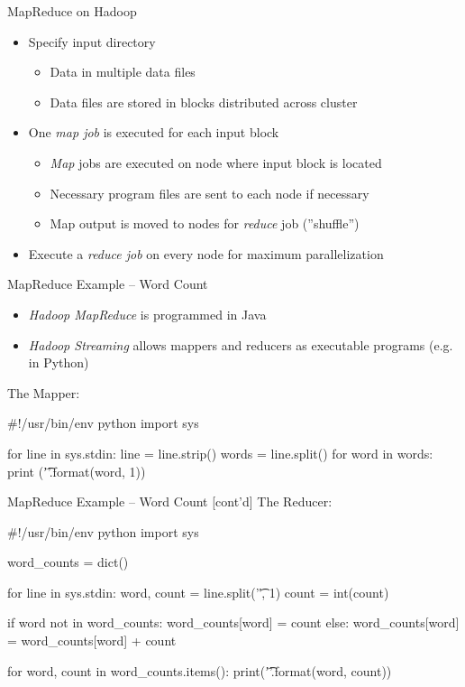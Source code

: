 \documentclass[ignorenonframetext,xcolor=x11names]{beamer}
\begin{document}
\begin{frame}{MapReduce on Hadoop}
\begin{itemize}
   \item Specify input directory
   \begin{itemize}
       \item Data in multiple data files
       \item Data files are stored in blocks distributed across cluster
   \end{itemize}
   \item One \emph{map job} is executed for each input block
   \begin{itemize}
       \item \emph{Map} jobs are executed on node where input block is located
       \item Necessary program files are sent to each node if necessary
       \item Map output is moved to nodes for \emph{reduce} job (''shuffle'')
   \end{itemize}
   \item Execute a \emph{reduce job} on every node for maximum parallelization
\end{itemize}
\end{frame}


\begin{frame}[fragile]{MapReduce Example -- Word Count}

\begin{itemize}
    \item \emph{Hadoop MapReduce} is programmed in Java
    \item \emph{Hadoop Streaming} allows mappers and reducers as executable programs (e.g. in Python)
\end{itemize}
\vspace{\baselineskip}
The Mapper:
\begin{pythoncode}
#!/usr/bin/env python
import sys

for line in sys.stdin:
    line = line.strip()
    words = line.split()
    for word in words:
        print ('{}\t{}'.format(word, 1))
\end{pythoncode}
\end{frame}

\begin{frame}[fragile]{MapReduce Example -- Word Count \small [cont'd]}
The Reducer:
\begin{pythoncode}
#!/usr/bin/env python
import sys

word_counts = dict()

for line in sys.stdin:
    word, count = line.split('\t', 1)
    count = int(count)

    if word not in word_counts:
       word_counts[word] = count
    else:
      word_counts[word] = word_counts[word] + count

for word, count in word_counts.items():
    print('{}\t{}'.format(word, count))
\end{pythoncode}
\end{frame}
\end{document}
